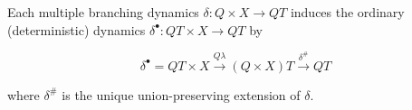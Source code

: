 Each multiple branching dynamics $\delta: Q \times X \longrightarrow QT$ induces the ordinary (deterministic) dynamics $\delta^\bullet: QT \times X \longrightarrow QT$ by

$$\delta^\bullet = QT \times X \xrightarrow{Q\lambda} (Q \times X)T \xrightarrow{\delta^\#} QT$$

where $\delta^\#$ is the unique union-preserving extension of $\delta$.
